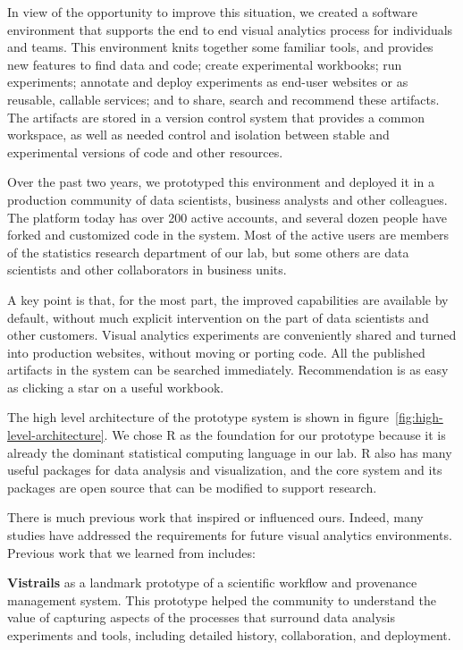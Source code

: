 In view of the opportunity to improve this situation,
we created a software environment that supports the end to end
visual analytics process for individuals and teams.
This environment knits together some familiar tools, and 
provides new features to find data and code; create experimental workbooks;
run experiments; annotate and deploy experiments as end-user websites or
as reusable, callable services; and to share, search and recommend these artifacts. The artifacts are stored in a version
control system that provides a common workspace, as well as needed control
and isolation between stable and experimental versions of code and other
resources. 

Over the past two years, we prototyped this environment and deployed it
in a production community of data scientists, business analysts and other colleagues.
The platform today has over 200 active accounts, and several dozen people have forked
and customized code in the system. Most of the active users are members of
the statistics research department of our lab, but some others are data
scientists and other collaborators in business units. 

A key point is that, for the most part, the improved capabilities are
available by default, without much explicit intervention on the part of
data scientists and other customers. Visual analytics experiments are
conveniently shared and turned into production websites, without moving
or porting code. All the published artifacts in the system can be
searched immediately. Recommendation is as easy as clicking a star
on a useful workbook.

The high level architecture of the prototype system
is shown in figure~\ref{fig:high-level-architecture}.
We chose R as the foundation for our prototype because it is already
the dominant statistical computing language in our lab.
R also has many useful packages for data analysis and visualization,
and the core system and its packages are open source that can be modified to
support research. 

There is much previous work that inspired or influenced ours.
Indeed, many studies have addressed the requirements for future visual
analytics environments.
Previous work that we learned from includes:

{\bf Vistrails} as a landmark prototype of a scientific workflow
and provenance management system. This prototype helped the community
to understand the value of capturing aspects of the processes that
surround data analysis experiments and tools, including detailed
history, collaboration, and deployment.

